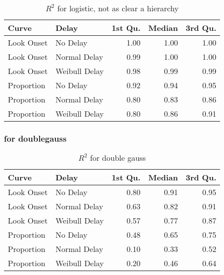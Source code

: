 \begin{table}[H]
\centering
\begin{tabular}{llrrr}
  \hline
Curve & Delay & 1st Qu. & Median & 3rd Qu. \\ 
  \hline
Look Onset & No Delay & 1.00 & 1.00 & 1.00 \\ 
  Look Onset & Normal Delay & 0.99 & 1.00 & 1.00 \\ 
  Look Onset & Weibull Delay & 0.98 & 0.99 & 0.99 \\ 
  Proportion & No Delay & 0.92 & 0.94 & 0.95 \\ 
  Proportion & Normal Delay & 0.80 & 0.83 & 0.86 \\ 
  Proportion & Weibull Delay & 0.80 & 0.86 & 0.91 \\ 
   \hline
\end{tabular}
\caption{$R^2$ for logistic, not as clear a hierarchy}
\label{tab:r2_logistic_sims}
\end{table}

\subsubsection{for doublegauss}

\begin{table}[H]
\centering
\begin{tabular}{llrrr}
  \hline
Curve & Delay & 1st Qu. & Median & 3rd Qu. \\ 
  \hline
Look Onset & No Delay & 0.80 & 0.91 & 0.95 \\ 
  Look Onset & Normal Delay & 0.63 & 0.82 & 0.91 \\ 
  Look Onset & Weibull Delay & 0.57 & 0.77 & 0.87 \\ 
  Proportion & No Delay & 0.48 & 0.65 & 0.75 \\ 
  Proportion & Normal Delay & 0.10 & 0.33 & 0.52 \\ 
  Proportion & Weibull Delay & 0.20 & 0.46 & 0.64 \\ 
   \hline
\end{tabular}
\caption{$R^2$ for double gauss}
\label{tab:r2_dg_sims}
\end{table}
